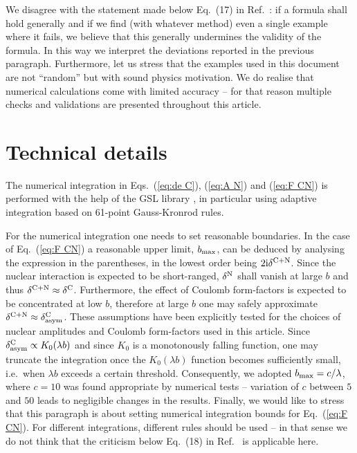 \documentclass{appolb}
\def\I{{\rm i}}
\def\NEW#1{{#1}}
\begin{document}
\NEW{We disagree with the statement made below Eq.~(17) in Ref.~\cite{petrov2020-2}: if a formula shall hold generally and if we find (with whatever method) even a single example where it fails, we believe that this generally undermines the validity of the formula. In this way we interpret the deviations reported in the previous paragraph. Furthermore, let us stress that the examples used in this document are not ``random'' but with sound physics motivation. We do realise that numerical calculations come with limited accuracy -- for that reason multiple checks and validations are presented throughout this article.}



\section{Technical details}
\label{sec:technical}

The numerical integration in Eqs.~(\ref{eq:de C}), (\ref{eq:A N}) and (\ref{eq:F CN}) is performed with the help of the GSL library \cite{gsl}, in particular using adaptive integration based on 61-point Gauss-Kronrod rules.

For the numerical integration one needs to set reasonable boundaries. In the case of Eq.~(\ref{eq:F CN}) a reasonable upper limit, $b_{\rm max}$, can be deduced by analysing the expression in the parentheses, in the lowest order being $2\I\delta^{\rm C+N}$. \NEW{Since the nuclear interaction is expected to be short-ranged, $\delta^{\rm N}$ shall vanish at large $b$ and thus $\delta^{\rm C+N} \approx \delta^{\rm C}$. Furthermore, the effect of Coulomb form-factors is expected to be concentrated at low $b$, therefore at large $b$ one may safely approximate $\delta^{\rm C+N} \approx \delta^{\rm C}_{\rm asym}$. These assumptions have been explicitly tested for the choices of nuclear amplitudes and Coulomb form-factors used in this article. Since $\delta^{\rm C}_{\rm asym} \propto K_0(\lambda b)$ and since $K_0$ is a monotonously falling function, one} may truncate the integration once the $K_0(\lambda b)$ function becomes sufficiently small, i.e.~when $\lambda b$ exceeds a certain threshold. Consequently, we adopted $b_{\rm max} = c / \lambda$, where $c = 10$ was found appropriate by numerical tests -- variation of $c$ between $5$ and $50$ leads to negligible changes in the results. \NEW{Finally, we would like to stress that this paragraph is about setting numerical integration bounds for Eq.~(\ref{eq:F CN}). For different integrations, different rules should be used -- in that sense we do not think that the criticism below Eq.~(18) in Ref.~\cite{petrov2020-2} is applicable here.}
\end{document}
